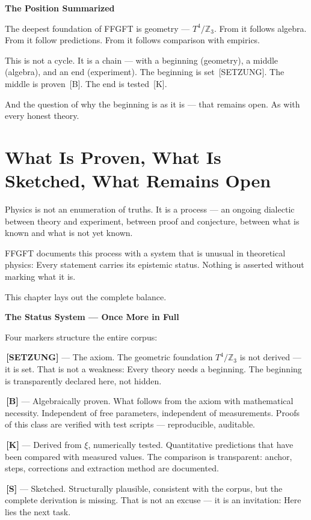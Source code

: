 \documentclass[11pt,oneside]{book}
\newcommand{\status}[1]{\penalty10000\,{\scriptsize\textcolor{gray!60}{[#1]}}}
\begin{document}
\textbf{The Position Summarized}

The deepest foundation of FFGFT is geometry — $T^4/\mathbb{Z}_3$. From it follows
algebra. From it follow predictions. From it follows comparison with empirics.

This is not a cycle. It is a chain — with a beginning (geometry), a middle
(algebra), and an end (experiment). The beginning is set \status{SETZUNG}.
The middle is proven \status{B}. The end is tested \status{K}.

And the question of why the beginning is as it is — that remains open.
As with every honest theory.


\chapter{What Is Proven, What Is Sketched, What Remains Open}

Physics is not an enumeration of truths. It is a process — an ongoing
dialectic between theory and experiment, between proof and conjecture,
between what is known and what is not yet known.

FFGFT documents this process with a system that is unusual in theoretical
physics: Every statement carries its epistemic status. Nothing is asserted
without marking what it is.

This chapter lays out the complete balance.

\textbf{The Status System — Once More in Full}

Four markers structure the entire corpus:

\textbf{\status{SETZUNG}} — The axiom. The geometric foundation $T^4/\mathbb{Z}_3$ is not
derived — it is set. That is not a weakness: Every theory needs a beginning.
The beginning is transparently declared here, not hidden.

\textbf{\status{B}} — Algebraically proven. What follows from the axiom with
mathematical necessity. Independent of free parameters, independent of
measurements. Proofs of this class are verified with test scripts —
reproducible, auditable.

\textbf{\status{K}} — Derived from $\xi$, numerically tested. Quantitative predictions
that have been compared with measured values. The comparison is transparent:
anchor, steps, corrections and extraction method are documented.

\textbf{\status{S}} — Sketched. Structurally plausible, consistent with the corpus,
but the complete derivation is missing. That is not an excuse — it is an
invitation: Here lies the next task.
\end{document}
